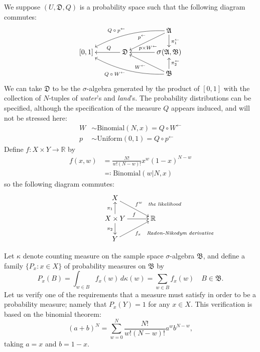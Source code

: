 \documentclass[
twoside=true,
paper=letter,
fontsize=9pt,
pagesize=auto,
leqno,
openany,
headsepline,
overfullrule,
]{scrbook}
\theoremstyle{plain}
\theoremstyle{plain}
\theoremstyle{definition}
\theoremstyle{bfnoteitalic}
\theoremstyle{bfnoteroman}
\newcommand{\sigalg}[1]{\mathfrak{#1}}
\newcommand{\defines}{\eqqcolon}
\newcommand{\sagb}{\mathop{\hbox{\large{$\sigma$}}}\nolimits}
\newcommand{\textsigma}{\hbox{\large{$\sigma$}}\kern-1pt}
\newcommand{\preimage}[1]{#1^{\leftarrow}}
\newcommand{\R}{\mathbb{R}}
\newcommand{\productsig}[2]{\sagb(#1,#2)}
\newcommand{\function}{f}
\newcommand{\measurespace}{X}
\newcommand{\measurespaceii}{Y}
\newcommand{\setii}{B}
\newcommand{\projectionone}{\pi_1}
\newcommand{\projectiontwo}{\pi_2}
\newcommand{\pspace}{\measurespace}%
\newcommand{\sspace}{\measurespaceii}%
\newcommand{\pspaceelt}{x}
\newcommand{\sspacesig}{\sigalg{B}}
\newcommand{\pspacesig}{\sigalg{A}}
\begin{document}
We suppose $(U,\sigalg{D},Q)$ is a probability space such that the following diagram commutes:
\[
\xymatrix@R=16pt@C=35pt{
 & & \pspacesig
 \ar@/_10pt/[dll]_{\makebox[0pt][r] {\scriptsize{$Q\circ\preimage{p}$}} }
 \ar[dl]_{\makebox[0pt][r]{\scriptsize{$\preimage{p}$}}}
 \ar[d]^{\preimage{\projectionone}}
 \\
 [0,1] & \sigalg{D} \ar[l]_-{\ Q} &
 \productsig{\pspacesig}{\sspacesig}
 \ar[l]_{\ \preimage{p\times W}}
 \\
 & & \sspacesig
  \ar[u]_{\preimage{\projectiontwo}}
  \ar[ul]^{\makebox[0pt][r]{\scriptsize{$\preimage{W}$}}}
  \ar@/^10pt/[ull]^{\makebox[0pt][r] {\scriptsize{$Q\circ\preimage{W}$}} }
  \\
}
\]
We can take $\sigalg{D}$ to be the \textsigma-algebra generated by
the product of $[0,1]$ with the collection of $N$-tuples of \textit{water}'s and \textit{land}'s.
The probability distributions can be specified, although the specification of the measure $Q$ appears induced, and will not be stressed here:
\begin{align*}
W & \sim \text{Binomial}(N, \pspaceelt) = Q\circ \preimage{W}\\
p & \sim \text{Uniform}(0, 1) = Q\circ \preimage{p}
\end{align*}
Define $\function:\pspace \times \sspace \to\R$ by
\begin{align*}
\function(\pspaceelt,w)
& =
\frac{N!}
{w!(N-w)!}
\pspaceelt^w(1-\pspaceelt)^{N-w} \\
& \defines
\text{Binomial}(w\vert N,\pspaceelt)
\end{align*}
so the following diagram commutes:
\[
\xymatrix@R=16pt@C=30pt{ 
\pspace
\ar[dr]^{\makebox[0pt][l]{\scriptsize{$\function^w$\quad\emph{the likelihood}}}}
& \\
\pspace\times\sspace 
\ar[u]^{\projectionone}
\ar[d]_{\projectiontwo}
\ar[r]^{\function}
& \R \\
\sspace 
\ar[ur]_{\makebox[0pt][l]{\scriptsize{$\function_x$\quad\emph{Radon-Nikodym derivative}}}}
& 
}
\]

Let $\kappa$ denote counting measure on the sample space \textsigma-algebra $\sspacesig$,
and define a family $\{P_\pspaceelt :\pspaceelt\in \pspace \}$ of probability measures on
$\sspacesig$ by
\[
P_\pspaceelt{(\setii)} =
\int_{w\in\setii}\function_\pspaceelt(w)\,d\kappa(w) =
\sum_{w\in\setii}\function_\pspaceelt(w)
\quad \setii\in\sspacesig.
\]
Let us verify one of the requirements that a measure must satisfy in order to be a probability measure; namely that
$P_\pspaceelt(\sspace)=1$ for any $\pspaceelt\in\pspace$. This verification is based on the binomial theorem:
\[
(a+b)^N=\sum_{w=0}^N
\frac{N!}
{w!(N-w)!}
a^w b^{N-w},
\]
taking $a=\pspaceelt$ and $b=1-\pspaceelt$.
\end{document}
